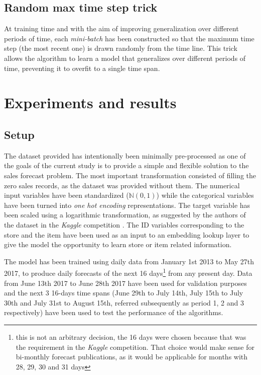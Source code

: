 \subsection{Random max time step trick}
At training time and with the aim of improving generalization over different periods of time, each \textit{mini-batch} has been constructed so that the maximum time step (the most recent one)  is drawn randomly from the time line. This trick allows the algorithm to learn a model that generalizes over different periods of time, preventing it to overfit to a single time span.

\section{Experiments and results} \label{sec:salesforecast_results}
\subsection{Setup}
The dataset provided has intentionally been minimally pre-processed as one of the goals of the current study is to provide a simple and flexible solution to the sales forecast problem. The most important transformation consisted of filling the zero sales records, as the dataset was provided without them. The numerical input variables have been standardized ($\mathbb{N}(0,1)$) while the categorical variables have been turned into \textit{one hot encoding} representations. The target variable has been scaled using a logarithmic transformation, as suggested by the authors of the dataset in the \textit{Kaggle} competition \autocite{corporacionfavoritadataset2018}. The ID variables corresponding to the store and the item have been used as an input to an embedding lookup layer to give the model the opportunity to learn store or item related information.

The model has been trained using daily data from January 1st 2013 to May 27th 2017, to produce daily forecasts of the next 16 days\footnote{this is not an arbitrary decision, the 16 days were chosen because that was the requirement in the \textit{Kaggle} competition. That choice would make sense for bi-monthly forecast publications, as it would be applicable for months with 28, 29, 30 and 31 days} from any present day. Data from  June 13th 2017 to June 28th 2017 have been used for validation purposes and the next 3 16-days time spans (June 29th to July 14th, July 15th to July 30th and July 31st to August 15th, referred subsequently as period 1, 2 and 3 respectively) have been used to test the performance of the algorithms.

